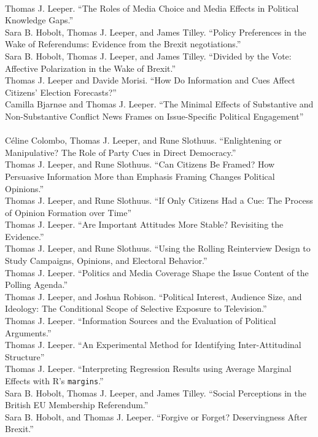 \documentclass[12pt]{article}
\renewcommand{\section}[1]{\pagebreak[3]%
    \llap{\scshape\smash{\parbox[t]{\marginparwidth}{\raggedright {\color{lg}#1}}}}%
    \vspace{-\baselineskip}\par}
\newcommand{\topic}[1]{\pagebreak[3]\indent {\color{lg}{\footnotesize #1 }}\\}
\newcommand{\entry}[1]{\indent {\color{lg}\guillemotright}\hspace{2pt}#1\vspace{.25em}\\}
\begin{document}
\section{Working Papers\\ \& Ongoing Projects}
\topic{Papers Under Review}
	\entry{Thomas J. Leeper. ``The Roles of Media Choice and Media Effects in Political Knowledge Gaps.''}
    \entry{Sara B. Hobolt, Thomas J. Leeper, and James Tilley. ``Policy Preferences in the Wake of Referendums: Evidence from the Brexit negotiations.''}
    \entry{Sara B. Hobolt, Thomas J. Leeper, and James Tilley. ``Divided by the Vote: Affective Polarization in the Wake of Brexit.''}
	\entry{Thomas J. Leeper and Davide Morisi. ``How Do Information and Cues Affect Citizens' Election Forecasts?''}
    \entry{Camilla Bjarn{\o}e and Thomas J. Leeper. ``The Minimal Effects of Substantive and Non-Substantive Conflict News Frames on Issue-Specific Political Engagement''}

\topic{Working Papers}
	\entry{C\'{e}line Colombo, Thomas J. Leeper, and Rune Slothuus. ``Enlightening or Manipulative? The Role of Party Cues in Direct Democracy.''}
	\entry{Thomas J. Leeper, and Rune Slothuus. ``Can Citizens Be Framed? How Persuasive Information More than Emphasis Framing Changes Political Opinions.''}
	\entry{Thomas J. Leeper, and Rune Slothuus. ``If Only Citizens Had a Cue: The Process of Opinion Formation over Time''}
	\entry{Thomas J. Leeper. ``Are Important Attitudes More Stable? Revisiting the Evidence.''}
    \entry{Thomas J. Leeper, and Rune Slothuus. ``Using the Rolling Reinterview Design to Study Campaigns, Opinions, and Electoral Behavior.''}
	\entry{Thomas J. Leeper. ``Politics and Media Coverage Shape the Issue Content of the Polling Agenda.''}
	\entry{Thomas J. Leeper, and Joshua Robison. ``Political Interest, Audience Size, and Ideology: The Conditional Scope of Selective Exposure to Television.''}
    \entry{Thomas J. Leeper. ``Information Sources and the Evaluation of Political Arguments.''}
	\entry{Thomas J. Leeper. ``An Experimental Method for Identifying Inter-Attitudinal Structure''}
	\entry{Thomas J. Leeper. ``Interpreting Regression Results using Average Marginal Effects with R's \texttt{margins}.''}
    \entry{Sara B. Hobolt, Thomas J. Leeper, and James Tilley. ``Social Perceptions in the British EU Membership Referendum.''}
    \entry{Sara B. Hobolt, and Thomas J. Leeper. ``Forgive or Forget? Deservingness After Brexit.''}
\end{document}

